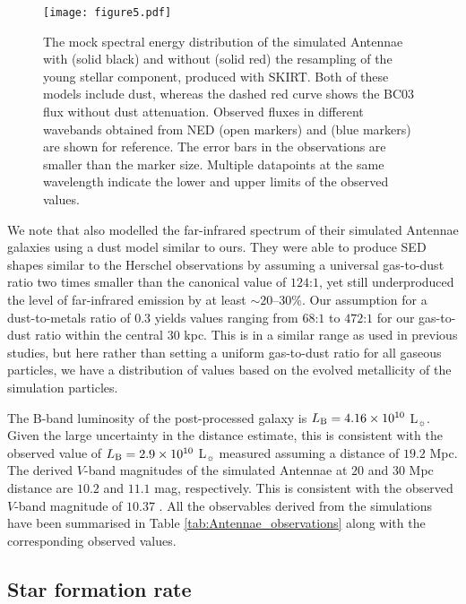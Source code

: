 \documentclass[a4paper,fleqn,usenatbib]{mnras}
\newcommand{\skirt}{\textsc{SKIRT}}
\begin{document}
\begin{figure*}
\texttt{[image: figure5.pdf]}
\caption{The mock spectral energy distribution of the simulated Antennae with (solid black) and without (solid red)
the resampling of the young stellar component, produced with \skirt. Both of these models include dust, whereas
the dashed red curve shows the BC03 flux without dust attenuation. 
Observed fluxes in different wavebands obtained from NED (open markers) and \citet{2010A&A...518L..44K} (blue markers) are shown for reference. 
The error bars in the observations
are smaller than the marker size. Multiple datapoints at the same wavelength indicate the lower and upper limits of the observed
values.}
\label{fig:Antennae_SED}
\end{figure*}


We note that \citet{2013MNRAS.434..696K} also modelled the far-infrared spectrum of their simulated Antennae
galaxies using a dust model similar to ours. 
They were able to produce SED shapes similar to the Herschel observations by assuming a universal gas-to-dust ratio
two times smaller than the canonical value of $124$:$1$, yet still underproduced the level
of far-infrared emission by at least $\sim 20$--$30\%$. Our assumption for a dust-to-metals ratio of $0.3$ 
yields values ranging from $68$:$1$ to $472$:$1$ for our gas-to-dust ratio within the central $30$ kpc. This is in a similar range as
used in previous studies, but here rather than setting a uniform gas-to-dust ratio for all gaseous particles, we have a distribution
of values based on the evolved metallicity of the simulation particles. 

The B-band luminosity of the post-processed galaxy is $L_{\rm B}=4.16 \times 10^{10}$ 
L$_{\sun}$. Given the large uncertainty in the distance estimate,
this is consistent with the 
observed value of $L_{\rm B}=2.9\times10^{10}$ L$_{\sun}$ \citep{2001AJ....122.2969H}
measured assuming a distance of $19.2$ Mpc. 
The derived $V$-band magnitudes of the simulated Antennae at $20$ and 
$30$ Mpc distance are $10.2$ and $11.1$ mag, respectively. This is consistent
with the observed $V$-band magnitude of $10.37$  \citep{1988cvip.book.....D}.
All the observables derived from the simulations have been summarised 
in Table \ref{tab:Antennae_observations} along with the corresponding observed values.


\subsection{Star formation rate}\label{section:sfr_observations_of_Antennae}
\end{document}
